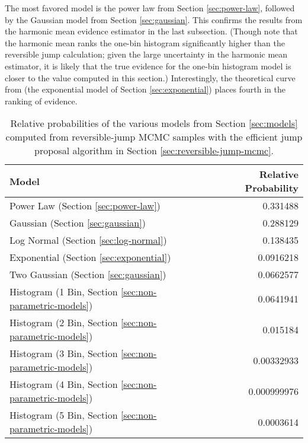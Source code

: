 \documentclass[preprint]{aastex}
\begin{document}
The most favored model is the power law from Section
\ref{sec:power-law}, followed by the Gaussian model from Section
\ref{sec:gaussian}.  This confirms the results from the harmonic mean
evidence estimator in the last subsection.  (Though note that the
harmonic mean ranks the one-bin histogram significantly higher than
the reversible jump calculation; given the large uncertainty in the
harmonic mean estimator, it is likely that the true evidence for the
one-bin histogram model is closer to the value computed in this
section.)  Interestingly, the theoretical curve from \citet{Fryer2001}
(the exponential model of Section \ref{sec:exponential}) places fourth
in the ranking of evidence.  

\begin{table}
  \begin{center}
    \begin{tabular}{|l|r|}
      \hline
      Model & Relative Probability \\
      \hline \hline
      Power Law (Section \ref{sec:power-law}) & 0.331488 \\
      \hline
      Gaussian (Section \ref{sec:gaussian}) & 0.288129 \\ 
      \hline
      Log Normal (Section \ref{sec:log-normal}) & 0.138435 \\
      \hline
      Exponential (Section \ref{sec:exponential}) & 0.0916218 \\
      \hline
      Two Gaussian (Section \ref{sec:gaussian}) & 0.0662577 \\
      \hline
      Histogram (1 Bin, Section \ref{sec:non-parametric-models}) &
      0.0641941 \\
      \hline
      Histogram (2 Bin, Section \ref{sec:non-parametric-models}) &
      0.015184 \\
      \hline 
      Histogram (3 Bin, Section \ref{sec:non-parametric-models}) &
      0.00332933 \\
      \hline
      Histogram (4 Bin, Section \ref{sec:non-parametric-models}) &
      0.000999976 \\
      \hline 
        Histogram (5 Bin, Section \ref{sec:non-parametric-models}) &
      0.0003614  \\
      \hline      
    \end{tabular}
  \end{center}
  \caption{\label{tab:rj} Relative probabilities of the various models
    from Section \ref{sec:models} computed from reversible-jump
    MCMC samples with the efficient jump proposal algorithm in Section \ref{sec:reversible-jump-mcmc}.}
\end{table}
\end{document}
